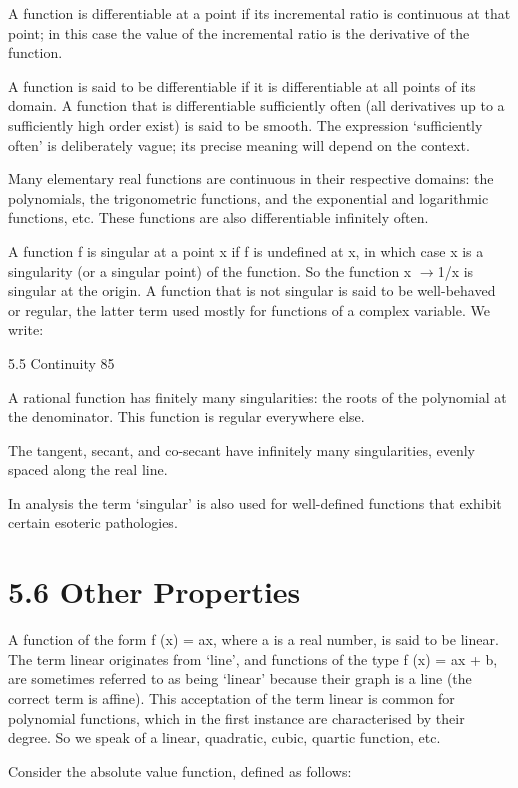 \documentclass[11pt]{article}
\theoremstyle{plain}
\theoremstyle{definition}
\begin{document}
A function is differentiable at a point if its incremental ratio is continuous at that point; in this case the value of the incremental ratio is the derivative of the function.

A function is said to be differentiable if it is differentiable at all points of its domain. A function that is differentiable sufficiently often (all derivatives up to a sufficiently high order exist) is said to be smooth. The expression `sufficiently often' is deliberately vague; its precise meaning will depend on the context.

Many elementary real functions are continuous in their respective domains: the polynomials, the trigonometric functions, and the exponential and logarithmic functions, etc. These functions are also differentiable infinitely often.

A function f is singular at a point x if f is undefined at x, in which case x is a singularity (or a singular point) of the function. So the function x $\to$1/x is singular at the origin. A function that is not singular is said to be well-behaved or regular, the latter term used mostly for functions of a complex variable. We write:

5.5 Continuity 85

A rational function has finitely many singularities: the roots of the polynomial at the denominator. This function is regular everywhere else.

The tangent, secant, and co-secant have infinitely many singularities, evenly spaced along the real line.

In analysis the term `singular' is also used for well-defined functions that exhibit certain esoteric pathologies.

\section{5.6 Other Properties}

A function of the form f (x) = ax, where a is a real number, is said to be linear. The term linear originates from `line', and functions of the type f (x) = ax + b, are sometimes referred to as being `linear' because their graph is a line (the correct term is affine). This acceptation of the term linear is common for polynomial functions, which in the first instance are characterised by their degree. So we speak of a linear, quadratic, cubic, quartic function, etc.

Consider the absolute value function, defined as follows:
\end{document}
